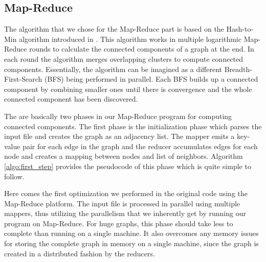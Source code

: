 \subsection{Map-Reduce}

The algorithm that we chose for the Map-Reduce part is based on the Hash-to-Min algorithm introduced in \cite{rastogi}. This algorithm works in multiple logarithmic Map-Reduce rounds  to calculate the connected components of a graph at the end. In each round the algorithm merges overlapping clusters to compute connected components. Essentially, the algorithm can be imagined as a different Breadth-First-Search (\eg BFS) being performed in parallel. Each BFS builds up a connected component by combining smaller ones until there is convergence and the whole connected component has been discovered.

The are basically two phases in our Map-Reduce program for computing connected components. The first phase is the initialization phase which parses the input file and creates the graph as an adjacency list. The mapper emits a key-value pair for each edge in the graph and the reducer accumulates edges for each node and creates a mapping between nodes and list of neighbors. Algorithm \ref{algo:first_step} provides the pseudocode of this phase which is quite simple to follow.

Here comes the first optimization we performed in the original code using the Map-Reduce platform. The input file is processed in parallel using multiple mappers, thus utilizing the parallelism that we inherently get by running our program on Map-Reduce. For huge graphs, this phase should take less to complete than running on a single machine. It also overcomes any memory issues for storing the complete graph in memory on a single machine, since the graph is created in a distributed fashion by the reducers.

